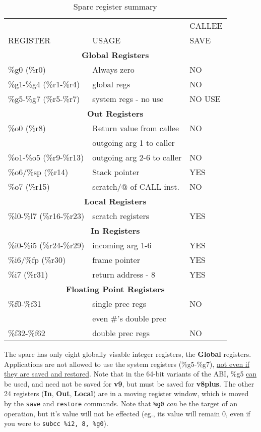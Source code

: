 \documentclass[11pt]{article}
\begin{document}
\begin{table}[hbt]
\begin{center}
\begin{tabular}{||l|l|l||}\hline\hline
         &       & CALLEE\\
REGISTER & USAGE & SAVE\\\hline\hline
\multicolumn{3}{||c||}{\bf Global Registers}\\\hline\hline
\%g0 (\%r0) & Always zero& NO \\\hline
\%g1-\%g4 (\%r1-\%r4) & global regs & NO \\\hline\hline
\%g5-\%g7 (\%r5-\%r7) & system regs - no use & NO USE\\\hline
\multicolumn{3}{||c||}{\bf Out Registers} \\\hline\hline
\%o0 (\%r8) & Return value from callee & NO\\
            & outgoing arg 1 to caller &\\\hline
\%o1-\%o5 (\%r9-\%r13) & outgoing arg 2-6 to caller & NO \\\hline
\%o6/\%sp (\%r14) & Stack pointer & YES \\\hline
\%o7 (\%r15) & scratch/@ of CALL inst. & NO \\\hline\hline
\multicolumn{3}{||c||}{\bf Local Registers} \\\hline\hline
\%l0-\%l7 (\%r16-\%r23) & scratch registers & YES \\\hline\hline
\multicolumn{3}{||c||}{\bf In Registers} \\\hline\hline
\%i0-\%i5 (\%r24-\%r29) & incoming arg 1-6  & YES \\\hline
\%i6/\%fp (\%r30) & frame pointer & YES \\\hline
\%i7 (\%r31) & return address - 8 & YES \\\hline\hline
\multicolumn{3}{||c||}{\bf Floating Point Registers} \\\hline\hline
\%f0-\%f31   & single prec regs   & NO  \\
             & even \#'s double prec &     \\\hline
\%f32-\%f62  & double prec regs   & NO  \\\hline\hline
\end{tabular}
\end{center}
\caption{Sparc register summary\label{tab-sparc-iregs}}
\end{table}

The sparc has only eight globally visable integer registers, the {\bf Global}
registers.  Applications are not allowed to use the system registers
(\%g5-\%g7), \underline{not even if they are saved and restored}.
Note that in the 64-bit variants of the ABI, \%g5 \underline{can} be
used, and need not be saved for {\bf v9}, but must be saved for {\bf v8plus}.
The other 24 registers ({\bf In}, {\bf Out}, {\bf Local})
are in a moving register window, which is moved by the {\tt save} and
{\tt restore} commands.  Note that {\tt \%g0} {\em can} be the target of
an operation, but it's value will not be effected (eg., its value will
remain 0, even if you were to {\tt subcc \%i2, 8, \%g0}).
\end{document}
